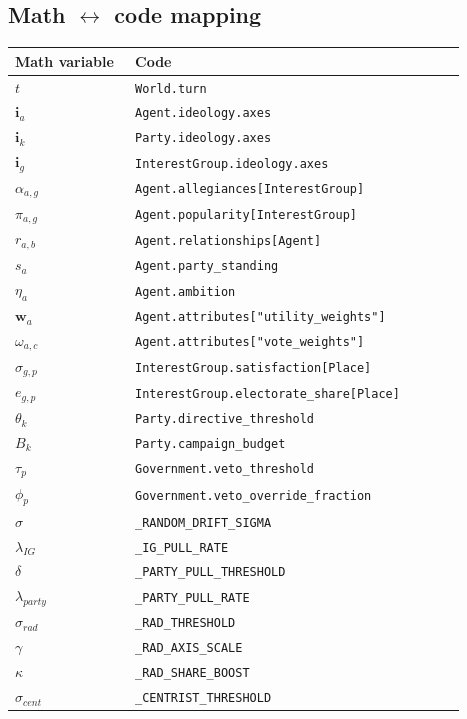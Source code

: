 \documentclass[11pt]{article}
\begin{document}
\subsection*{Math $\leftrightarrow$ code mapping}
\begin{longtable}{@{}p{0.25\linewidth}p{0.69\linewidth}@{}}
\toprule
\textbf{Math variable} & \textbf{Code} \\
\midrule
\endhead
$t$ & \texttt{World.turn} \\
$\mathbf{i}_a$ & \texttt{Agent.ideology.axes} \\
$\mathbf{i}_k$ & \texttt{Party.ideology.axes} \\
$\mathbf{i}_g$ & \texttt{InterestGroup.ideology.axes} \\
$\alpha_{a,g}$ & \texttt{Agent.allegiances[InterestGroup]} \\
$\pi_{a,g}$ & \texttt{Agent.popularity[InterestGroup]} \\
$r_{a,b}$ & \texttt{Agent.relationships[Agent]} \\
$s_a$ & \texttt{Agent.party\_standing} \\
$\eta_a$ & \texttt{Agent.ambition} \\
$\mathbf{w}_a$ & \texttt{Agent.attributes["utility\_weights"]} \\
$\omega_{a,c}$ & \texttt{Agent.attributes["vote\_weights"]} \\
$\sigma_{g,p}$ & \texttt{InterestGroup.satisfaction[Place]} \\
$e_{g,p}$ & \texttt{InterestGroup.electorate\_share[Place]} \\
$\theta_k$ & \texttt{Party.directive\_threshold} \\
$B_k$ & \texttt{Party.campaign\_budget} \\
$\tau_p$ & \texttt{Government.veto\_threshold} \\
$\phi_p$ & \texttt{Government.veto\_override\_fraction} \\
$\sigma$ & \texttt{\_RANDOM\_DRIFT\_SIGMA} \\
$\lambda_{IG}$ & \texttt{\_IG\_PULL\_RATE} \\
$\delta$ & \texttt{\_PARTY\_PULL\_THRESHOLD} \\
$\lambda_{party}$ & \texttt{\_PARTY\_PULL\_RATE} \\
$\sigma_{rad}$ & \texttt{\_RAD\_THRESHOLD} \\
$\gamma$ & \texttt{\_RAD\_AXIS\_SCALE} \\
$\kappa$ & \texttt{\_RAD\_SHARE\_BOOST} \\
$\sigma_{cent}$ & \texttt{\_CENTRIST\_THRESHOLD} \\
\bottomrule
\end{longtable}
\end{document}
